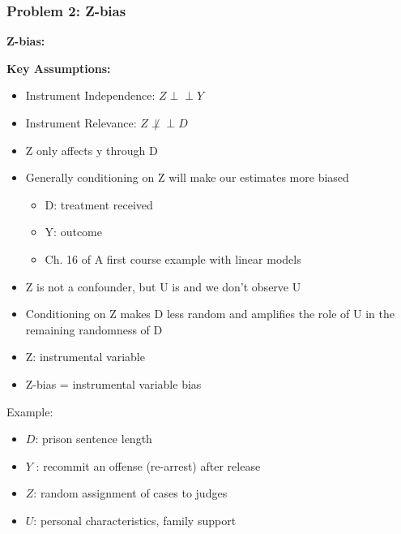 \subsubsection{Problem 2: Z-bias}
\textbf{Z-bias:}
\begin{center}
\end{center}

\textbf{Key Assumptions:}
\begin{itemize}
\item Instrument Independence: \( Z \perp\!\!\!\perp Y \)
\item Instrument Relevance: \( Z \not\perp\!\!\!\perp D \)
\item Z only affects y through D
\end{itemize}


\begin{itemize}
    \item Generally conditioning on Z will make our estimates more biased
    \begin{itemize}
    \item D: treatment received
    \item Y: outcome
    \item Ch. 16 of A first course example with linear models
    \end{itemize}
    \item Z is not a confounder, but U is and we don't observe U 
    \item Conditioning on Z makes D less random and amplifies the role of U in the remaining randomness of D 
    \item Z: instrumental variable 
    \item Z-bias = instrumental variable bias 
\end{itemize}
Example: 
\begin{itemize}
\item \(D \): prison sentence length 
\item \( Y \) : recommit an offense (re-arrest) after release
\item \( Z \): random assignment of cases to judges 
\item \( U \): personal characteristics, family support
\end{itemize}

